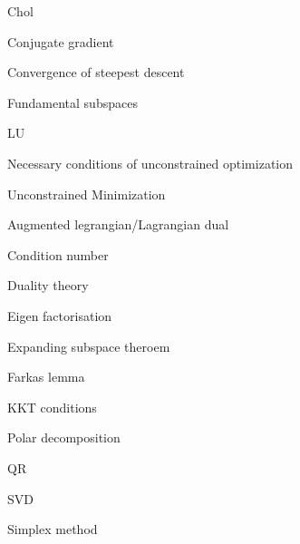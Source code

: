 \def\todo{\item[$\blacktriangleright$]}
\def\done{\item[$\circledcirc$]}
\begin{slide}
\begin{multicols*}{2}
\begin{description}
	\itemsep0pt
	\done Chol
	\done Conjugate gradient
	\done Convergence of steepest descent
	\done Fundamental subspaces
	\done LU
	\done Necessary conditions of unconstrained optimization
	\done Unconstrained Minimization
	\todo Augmented legrangian/Lagrangian dual
	\todo Condition number
	\todo Duality theory
	\todo Eigen factorisation
	\todo Expanding subspace theroem
	\todo Farkas lemma
	\todo KKT conditions
	\todo Polar decomposition
	\todo QR
	\todo SVD
	\todo Simplex method
\end{description}
\end{multicols*}
\end{slide}

